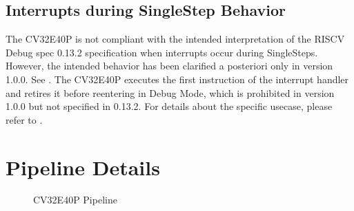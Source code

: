 \documentclass[letterpaper,10pt,english]{sphinxmanual}
\begin{document}
\section{Interrupts during Single\sphinxhyphen{}Step Behavior}
\label{\detokenize{debug:interrupts-during-single-step-behavior}}\label{\detokenize{debug:interrupts-single-stepping}}
\sphinxAtStartPar
The CV32E40P is not compliant with the intended interpretation of the RISC\sphinxhyphen{}V Debug spec 0.13.2 specification when interrupts occur during Single\sphinxhyphen{}Steps.
However, the intended behavior has been clarified a posteriori only in version 1.0.0.
See .
The CV32E40P executes the first instruction of the interrupt handler and retires it before re\sphinxhyphen{}entering in Debug Mode, which is prohibited in version 1.0.0 but not specified in 0.13.2.
For details about the specific use\sphinxhyphen{}case, please refer to .

\sphinxstepscope


\chapter{Pipeline Details}
\label{\detokenize{pipeline:pipeline-details}}\label{\detokenize{pipeline:id1}}\label{\detokenize{pipeline::doc}}
\begin{figure}[htbp]
\centering
\capstart

\noindent{}
\caption{CV32E40P Pipeline}\label{\detokenize{pipeline:cv32e40p-pipeline}}\end{figure}
\end{document}
